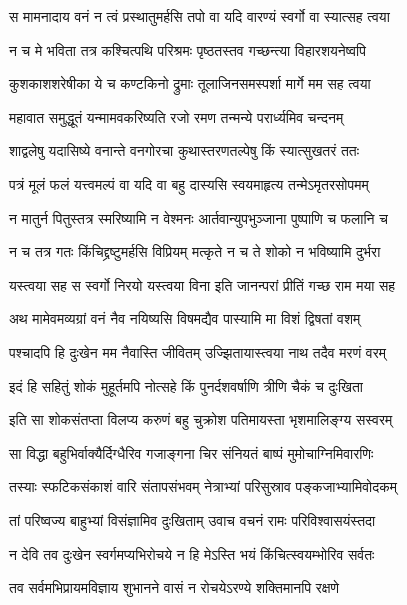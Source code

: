 \twolineshloka
{स मामनादाय वनं न त्वं प्रस्थातुमर्हसि}
{तपो वा यदि वारण्यं स्वर्गो वा स्यात्सह त्वया} %

\twolineshloka
{न च मे भविता तत्र कश्चित्पथि परिश्रमः}
{पृष्ठतस्तव गच्छन्त्या विहारशयनेष्वपि} %

\twolineshloka
{कुशकाशशरेषीका ये च कण्टकिनो द्रुमाः}
{तूलाजिनसमस्पर्शा मार्गे मम सह त्वया} %

\twolineshloka
{महावात समुद्धूतं यन्मामवकरिष्यति}
{रजो रमण तन्मन्ये परार्ध्यमिव चन्दनम्} %

\twolineshloka
{शाद्वलेषु यदासिष्ये वनान्ते वनगोरचा}
{कुथास्तरणतल्पेषु किं स्यात्सुखतरं ततः} %

\twolineshloka
{पत्रं मूलं फलं यत्त्वमल्पं वा यदि वा बहु}
{दास्यसि स्वयमाहृत्य तन्मेऽमृतरसोपमम्} %

\twolineshloka
{न मातुर्न पितुस्तत्र स्मरिष्यामि न वेश्मनः}
{आर्तवान्युपभुञ्जाना पुष्पाणि च फलानि च} %

\twolineshloka
{न च तत्र गतः किंचिद्द्रष्टुमर्हसि विप्रियम्}
{मत्कृते न च ते शोको न भविष्यामि दुर्भरा} %

\twolineshloka
{यस्त्वया सह स स्वर्गो निरयो यस्त्वया विना}
{इति जानन्परां प्रीतिं गच्छ राम मया सह} %

\twolineshloka
{अथ मामेवमव्यग्रां वनं नैव नयिष्यसि}
{विषमद्यैव पास्यामि मा विशं द्विषतां वशम्} %

\twolineshloka
{पश्चादपि हि दुःखेन मम नैवास्ति जीवितम्}
{उज्झितायास्त्वया नाथ तदैव मरणं वरम्} %

\twolineshloka
{इदं हि सहितुं शोकं मुहूर्तमपि नोत्सहे}
{किं पुनर्दशवर्षाणि त्रीणि चैकं च दुःखिता} %

\twolineshloka
{इति सा शोकसंतप्ता विलप्य करुणं बहु}
{चुक्रोश पतिमायस्ता भृशमालिङ्ग्य सस्वरम्} %

\twolineshloka
{सा विद्धा बहुभिर्वाक्यैर्दिग्धैरिव गजाङ्गना}
{चिर संनियतं बाष्पं मुमोचाग्निमिवारणिः} %

\twolineshloka
{तस्याः स्फटिकसंकाशं वारि संतापसंभवम्}
{नेत्राभ्यां परिसुस्राव पङ्कजाभ्यामिवोदकम्} %

\twolineshloka
{तां परिष्वज्य बाहुभ्यां विसंज्ञामिव दुःखिताम्}
{उवाच वचनं रामः परिविश्वासयंस्तदा} %

\twolineshloka
{न देवि तव दुःखेन स्वर्गमप्यभिरोचये}
{न हि मेऽस्ति भयं किंचित्स्वयम्भोरिव सर्वतः} %

\twolineshloka
{तव सर्वमभिप्रायमविज्ञाय शुभानने}
{वासं न रोचयेऽरण्ये शक्तिमानपि रक्षणे} %


